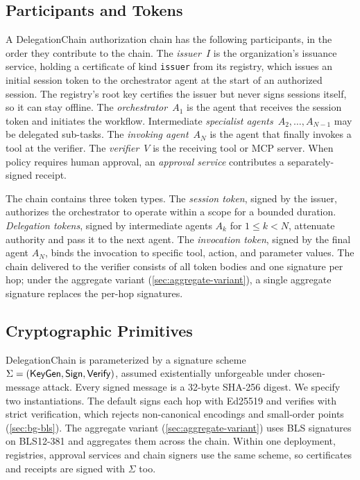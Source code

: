 \documentclass[11pt,a4paper]{article}
\begin{document}
\subsection{Participants and Tokens}
\label{sec:protocol-participants}

A DelegationChain authorization chain has the following participants, in
the order they contribute to the chain. The \emph{issuer}~$I$ is the
organization's issuance service, holding a certificate of kind
\texttt{issuer} from its registry, which issues an initial session token
to the orchestrator agent at the start of an authorized session. The
registry's root key certifies the issuer but never signs sessions
itself, so it can stay offline. The
\emph{orchestrator}~$A_1$ is the agent that receives the session token
and initiates the workflow. Intermediate \emph{specialist
agents}~$A_2, \ldots, A_{N-1}$ may be delegated sub-tasks. The
\emph{invoking agent}~$A_N$ is the agent that finally invokes a tool at
the verifier. The \emph{verifier}~$V$ is the receiving tool or MCP
server. When policy requires human approval, an \emph{approval service}
contributes a separately-signed receipt.

The chain contains three token types. The \emph{session token},
signed by the issuer, authorizes the orchestrator to operate within a
scope for a bounded duration. \emph{Delegation tokens}, signed by
intermediate agents $A_k$ for $1 \le k < N$, attenuate authority and
pass it to the next agent. The \emph{invocation token}, signed by the
final agent $A_N$, binds the invocation to specific tool, action, and
parameter values. The chain delivered to the verifier consists of all
token bodies and one signature per hop; under the aggregate variant
(\cref{sec:aggregate-variant}), a single aggregate signature replaces
the per-hop signatures.

\subsection{Cryptographic Primitives}
\label{sec:protocol-primitives}

DelegationChain is parameterized by a signature scheme
$\Sigma = (\mathsf{KeyGen}, \mathsf{Sign}, \mathsf{Verify})$, assumed existentially
unforgeable under chosen-message attack. Every signed message is a
32-byte SHA-256 digest. We specify two instantiations. The default signs
each hop with Ed25519 \citep{rfc8032} and verifies with strict
verification, which rejects non-canonical encodings and small-order
points (\cref{sec:bg-bls}). The aggregate variant
(\cref{sec:aggregate-variant}) uses BLS signatures on BLS12-381 and
aggregates them across the chain. Within one deployment, registries,
approval services and chain signers use the same scheme, so certificates
and receipts are signed with $\Sigma$ too.
\end{document}
